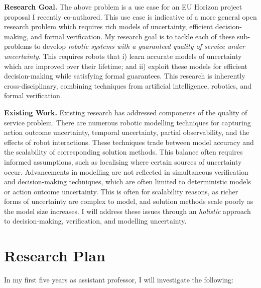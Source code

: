 \documentclass[12pt]{article}
\begin{document}
%
%
%


\vspace*{1ex}\noindent\textbf{Research Goal.} The above problem is a use case for an EU Horizon project proposal I recently co-authored.
%
This use case is indicative of a more general open research problem which requires rich models of uncertainty, efficient decision-making, and formal verification.
%
My research goal is to tackle each of these sub-problems to develop \emph{robotic systems with a guaranteed quality of service under uncertainty}.
%
This requires robots that i) learn accurate models of uncertainty which are improved over their lifetime; and ii) exploit these models for efficient decision-making while satisfying formal guarantees.
%
This research is inherently cross-disciplinary, combining techniques from artificial intelligence, robotics, and formal verification.

\vspace*{1ex}\noindent\textbf{Existing Work.} Existing research has addressed components of the quality of service problem.
%
There are numerous robotic modelling techniques for capturing action outcome uncertainty, temporal uncertainty, partial observability, and the effects of robot interactions.
%
These techniques trade between model accuracy and the scalability of corresponding solution methods.
%
This balance often requires informed assumptions, such as localising where certain sources of uncertainty occur.
%
Advancements in modelling are not reflected in simultaneous verification and decision-making techniques, which are often limited to deterministic models or action outcome uncertainty.
%
This is often for scalability reasons, as richer forms of uncertainty are complex to model, and solution methods scale poorly as the model size increases.
%
I will address these issues through an \emph{holistic} approach to decision-making, verification, and modelling uncertainty.

\section*{Research Plan}

In my first five years as assistant professor, I will investigate the following:
\end{document}
